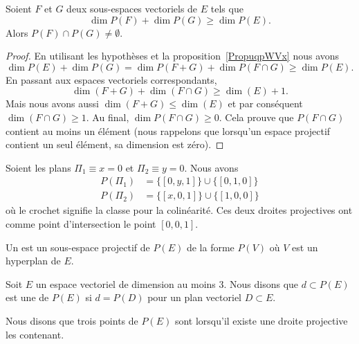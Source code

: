 \begin{theorem}[incidence]
	Soient \( F\) et \( G\) deux sous-espaces vectoriels de \( E\) tels que
	\begin{equation}
		\dim P(F)+\dim P(G)\geq \dim P(E).
	\end{equation}
	Alors \( P(F)\cap P(G)\neq \emptyset\).
\end{theorem}

\begin{proof}
	En utilisant les hypothèses et la proposition~\ref{PropuqpWVx} nous avons
	\begin{equation}
		\dim P(E)+\dim P(G)=\dim P(F+G)+\dim P(F\cap G)\geq \dim P(E).
	\end{equation}
	En passant aux espaces vectoriels correspondants,
	\begin{equation}
		\dim(F+G)+\dim(F\cap G)\geq \dim(E)+1.
	\end{equation}
	Mais nous avons aussi \( \dim(F+G)\leq \dim(E)\) et par conséquent \( \dim(F\cap G)\geq 1\). Au final, \( \dim P(F\cap G)\geq 0\). Cela prouve que \( P(F\cap G)\) contient au moins un élément (nous rappelons que lorsqu'un espace projectif contient un seul élément, sa dimension est zéro).
\end{proof}

\begin{example}
	Soient les plans \( \Pi_1\equiv x=0\) et \( \Pi_2\equiv y=0\). Nous avons
	\begin{subequations}
		\begin{align}
			P(\Pi_1) & =\{ [0,y,1] \}\cup\{ [0,1,0] \} \\
			P(\Pi_2) & =\{ [x,0,1] \}\cup\{ [1,0,0] \}
		\end{align}
	\end{subequations}
	où le crochet signifie la classe pour la colinéarité. Ces deux droites projectives ont comme point d'intersection le point \( [0,0,1]\).
\end{example}

\begin{definition}
	Un  est un sous-espace projectif de \( P(E)\) de la forme \( P(V)\) où \( V\) est un hyperplan de \( E\).
\end{definition}

\begin{definition}      \label{DEFooBBMBooSVgTnn}
	Soit \( E\) un espace vectoriel de dimension au moins \( 3\). Nous disons que \( d\subset P(E)\) est une  de \( P(E)\) si \( d=P(D)\) pour un plan vectoriel \( D\subset E\).

	Nous disons que trois points de \( P(E)\) sont  lorsqu'il existe une droite projective les contenant.
\end{definition}

